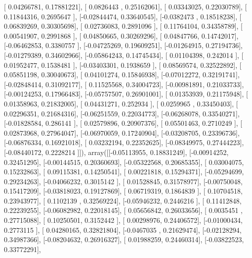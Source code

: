 \documentclass{article}
\begin{document}
       [ 0.04266781,  0.17881221],
       [ 0.0826443 ,  0.25162061],
       [ 0.03343025,  0.22030789],
       [ 0.11844316,  0.2695647 ],
       [-0.02844474,  0.33640545],
       [-0.0382473 ,  0.18518238],
       [ 0.06839269,  0.30305698],
       [ 0.02736083,  0.2891096 ],
       [ 0.11764104,  0.34358789],
       [ 0.00541907,  0.2991868 ],
       [ 0.04850665,  0.30269296],
       [ 0.04847766,  0.14742017],
       [-0.06462853,  0.3380757 ],
       [-0.04725269,  0.19609251],
       [-0.01264915,  0.27194736],
       [-0.01279389,  0.34602966],
       [-0.05864243,  0.14745434],
       [ 0.01104398,  0.242014  ],
       [ 0.01952477,  0.1538481 ],
       [-0.03403301,  0.1938659 ],
       [ 0.08569574,  0.32522892],
       [ 0.05851198,  0.30040673],
       [ 0.04101274,  0.15846938],
       [-0.07012272,  0.32191741],
       [-0.02848414,  0.31092177],
       [ 0.11525568,  0.34004723],
       [-0.00981891,  0.21033733],
       [-0.00124253,  0.17966483],
       [-0.05757507,  0.26901001],
       [ 0.01353939,  0.21175948],
       [ 0.01358963,  0.21832005],
       [ 0.04431271,  0.252934  ],
       [ 0.0259965 ,  0.33450403],
       [ 0.02296351,  0.21684316],
       [-0.06251559,  0.22034773],
       [-0.06268078,  0.33540271],
       [-0.01828584,  0.286141  ],
       [ 0.02579896,  0.20907376],
       [ 0.05501463,  0.2710249 ],
       [ 0.02873968,  0.27964047],
       [-0.06970059,  0.17240904],
       [-0.03208705,  0.23396736],
       [-0.06876334,  0.16921018],
       [ 0.03232194,  0.22352625],
       [-0.08349975,  0.27444223],
       [-0.08440172,  0.2228214 ]]), array([[-0.05113955,  0.18831249],
       [-0.00914252,  0.32451295],
       [-0.00144515,  0.20360693],
       [-0.05322568,  0.20685355],
       [ 0.03004075,  0.15232863],
       [ 0.09115381,  0.14250541],
       [ 0.00221818,  0.15294371],
       [-0.05294699,  0.29234263],
       [-0.04066232,  0.3015142 ],
       [ 0.01528845,  0.31578977],
       [-0.00750048,  0.15417209],
       [-0.03818023,  0.19127869],
       [ 0.06719319,  0.1864839 ],
       [ 0.10704518,  0.23943977],
       [ 0.1102139 ,  0.32569224],
       [-0.05946232,  0.2446216 ],
       [ 0.11412848,  0.22239255],
       [-0.06082982,  0.22018145],
       [ 0.05656842,  0.26033656],
       [ 0.0035451 ,  0.27715088],
       [ 0.10250501,  0.3152442 ],
       [ 0.00298976,  0.24406572],
       [-0.01000434,  0.2773115 ],
       [ 0.04280165,  0.32821804],
       [-0.0467035 ,  0.21629474],
       [-0.02128294,  0.34987366],
       [-0.08204632,  0.26916327],
       [ 0.01988259,  0.24460314],
       [-0.03822523,  0.33772291],
\end{document}
